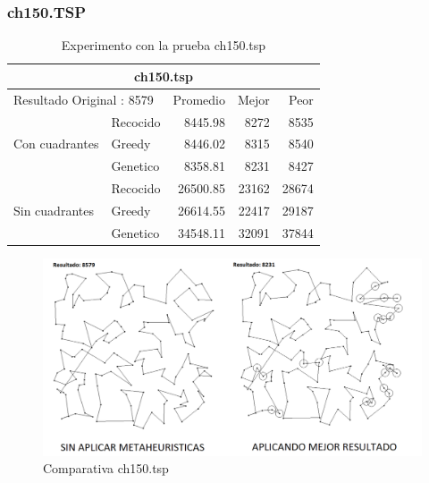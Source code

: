 \subsubsection{ch150.TSP}
\begin{table}[hbtp]
 \centering	
	\begin{tabular}{ | l   l | r | r | r |   }
         \hline\multicolumn{5}{|c|}{ \rowcolor[gray]{0.8} ch150.tsp } \\\hline
         \multicolumn{2}{|l|}{Resultado Original : 8579}   & Promedio & Mejor & Peor \\ \hline
                        & Recocido  &  8445.98 & 8272 & 8535  \\ 
         Con cuadrantes & Greedy    &  8446.02 & 8315 & 8540  \\ 
                        & Genetico  &  8358.81 & 8231 & 8427  \\ \hline
                        & Recocido  &  26500.85 & 23162 & 28674   \\ 
         Sin cuadrantes & Greedy    &  26614.55 & 22417 & 29187   \\ 
                        & Genetico  &  34548.11 & 32091 & 37844    \\ \hline
    \end{tabular}
    \caption{Experimento con la prueba ch150.tsp}
    \label{table:EXP_ch150.tsp}
\end{table}
 \begin{figure}[hbtp]
    \centering
        \includegraphics[width=1\textwidth]{PruebasResultados/Experimentos_Comparativas/ch150.png}
        \caption{Comparativa ch150.tsp}
        \label{fig:ch150_comparativa.png}
\end{figure}
